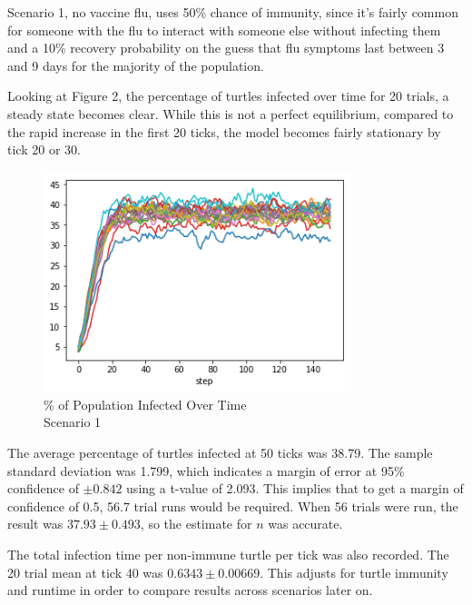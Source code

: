 \documentclass[11pt]{article} %
\begin{document}
Scenario 1, no vaccine flu, uses 50\% chance of immunity, since it's fairly common for someone with the flu to interact with someone else without infecting them and a 10\% recovery probability on the guess that flu symptoms last between 3 and 9 days for the majority of the population.


Looking at Figure 2, the percentage of turtles infected over time for 20 trials, a steady state becomes clear. While this is not a perfect equilibrium, compared to the rapid increase in the first 20 ticks, the model becomes fairly stationary by tick 20 or 30.   

\begin{figure}
\centering
\includegraphics[width=0.8\textwidth]{scen_1_steady_state}
\caption{\% of Population Infected Over Time \\ Scenario 1}
\end{figure}



The average percentage of turtles infected at 50 ticks was 38.79. The sample standard deviation was 1.799, which indicates a margin of error at 95\% confidence of $\pm 0.842$ using a t-value of 2.093. This implies that to get a margin of confidence of 0.5, 56.7 trial runs would be required. When 56 trials were run, the result was $37.93 \pm 0.493$, so the estimate for $n$ was accurate. 

The total infection time per non-immune turtle per tick was also recorded. The 20 trial mean at tick 40 was $0.6343 \pm 0.00669$. This adjusts for turtle immunity and runtime in order to compare results across scenarios later on. 

\end{document}
